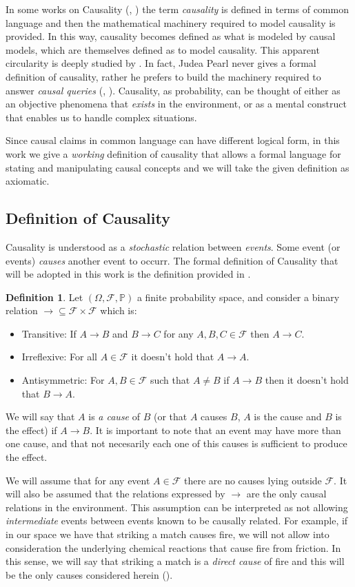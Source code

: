 \documentclass[english,letterpaper,12pt,final]{article}
\theoremstyle{definition}
\newtheorem{defi}{Definition}[section]
\begin{document}
In some works on Causality (\cite{spirtes2000causation}, \cite{pearl2009causality}) the term \textit{causality} is defined in terms of common language and then the mathematical machinery required to model causality is provided. In this way, causality becomes defined as what is modeled by causal models, which are themselves defined as to model causality. This apparent circularity is deeply studied by \cite{woodward2005making}. In fact, Judea Pearl never gives a formal definition of causality, rather he prefers to build the machinery required to answer \textit{causal queries} (\cite{pearl2009causality}, \cite{pearl2018theoretical}). Causality, as probability, can be thought of either as an objective phenomena that \textit{exists} in the environment, or as a mental construct that enables us to handle complex situations.
	
Since causal claims in common language can have different logical form, in this work we give a \textit{working} definition of causality that allows a formal language for stating and manipulating causal concepts and we will take the given definition as axiomatic. 
	\subsection{Definition of Causality}
	Causality is understood as a \textit{stochastic} relation between \textit{events}. Some event (or events) \textit{causes} another event to occurr. 
	The formal definition of Causality that will be adopted in this work is the definition provided in \cite{spirtes2000causation}.
	\begin{defi}{\label{causal_relation}}
	Let $(\Omega, \mathcal{F}, \mathbb{P})$ a finite probability space, and consider a binary relation $\to \subseteq \mathcal{F} \times \mathcal{F}$ which is:
	\begin{itemize}
	\item Transitive: If $A \to B$ and $B \to C$ for any $A, B, C \in \mathcal{F}$ then $A \to C$.
	\item Irreflexive: For all $A \in \mathcal{F}$ it doesn't hold that $A \to A$.
	\item Antisymmetric: For $A,B \in \mathcal{F}$ such that $A \neq B$ if $A \to B$ then it doesn't hold that $B \to A$.
	\end{itemize}
	We will say that $A$ is \textit{a cause} of $B$ (or that $A$ causes $B$, $A$ is the cause and $B$ is the effect) if $A \to B$. It is important to note that an event may have more than one cause, and that not necesarily each one of this causes is sufficient to produce the effect. 
	\end{defi}
	We will assume that for any event $A \in \mathcal{F}$ there are no causes lying outside $\mathcal{F}$. It will also be assumed that the relations expressed by $\to$ are the only causal relations in the environment. This assumption can be interpreted as not allowing \textit{intermediate} events between events known to be causally related. For example, if in our space we have that striking a match causes fire, we will not allow into consideration the underlying chemical reactions that cause fire from friction. In this sense, we will say that striking a match is a \textit{direct cause} of fire and this will be the only causes considered herein (\cite{spirtes2000causation}). 
\end{document}
